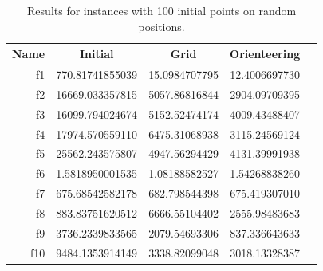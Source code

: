 \documentclass[smallextended]{svjour3}
\begin{document}
\begin{table}[!htbp]
  \centering
  \caption{Results for instances with 100 initial points on random positions.}
%
\begin{tabular}{r|SSSS}
  \toprule
  {Name} & {Initial} & {Grid} & {Orienteering} \\
  \midrule
  f1  & 770.81741855039 & 15.0984707795 & 12.4006697730  \\ 
  f2  & 16669.033357815 & 5057.86816844 & 2904.09709395  \\ 
  f3  & 16099.794024674 & 5152.52474174 & 4009.43488407  \\ 
  f4  & 17974.570559110 & 6475.31068938 & 3115.24569124  \\ 
  f5  & 25562.243575807 & 4947.56294429 & 4131.39991938  \\ 
  f6  & 1.5818950001535 & 1.08188582527 & 1.54268838260  \\ 
  f7  & 675.68542582178 & 682.798544398 & 675.419307010  \\ 
  f8  & 883.83751620512 & 6666.55104402 & 2555.98483683  \\ 
  f9  & 3736.2339833565 & 2079.54693306 & 837.336643633  \\ 
  f10 & 9484.1353914149 & 3338.82099048 & 3018.13328387  \\
  \bottomrule
\end{tabular}
  \label{tab:res100b}
\end{table}
\end{document}
